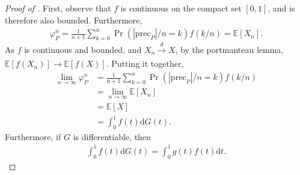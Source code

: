 \documentclass[a4paper]{article}
\newcommand{\dt}{\mathrm{d}t}
\newcommand{\dG}{\mathrm{d}G}
\newcommand{\E}{\mathbb{E}}
\newcommand{\precede}{\mathrm{prec}}
\begin{document}
\begin{proof}[Proof of ]
    First, observe that $f$ is continuous on the compact set $[0, 1]$, and is therefore also bounded.
    Furthermore,
    \begin{align*}
        \varphi_P^n = \frac{1}{n+1} \sum_{k=0}^n \Pr(|\precede_P| / n = k) f(k/n) = \E[X_n].
    \end{align*}
    As $f$ is continuous and bounded, and $X_n \xrightarrow[]{d} X$, by the portmanteau lemma, $\E[f(X_n)] \to \E[f(X)]$.
    Putting it together,
    \begin{align*}
        \lim_{n \to \infty} \varphi_P^n &= \frac{1}{n+1} \sum_{k=0}^n \Pr(|\precede_P| / n = k) f(k/n) \\
        &= \lim_{n \to \infty} \E[X_n] \\
        &= \E[X] \\
        &= \int_0^1 f(t) \dG(t).
    \end{align*}
    Furthermore, if $G$ is differentiable, then
    \begin{align*}
        \int_0^1 f(t) \dG(t) = \int_0^1 g(t) f(t) \dt.
    \end{align*}
\end{proof}
\end{document}

